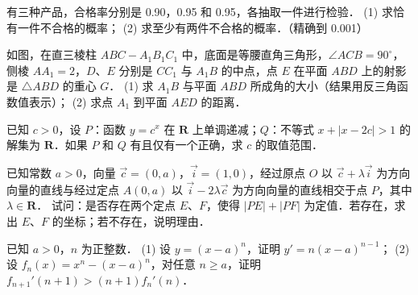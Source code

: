 \begin{question}
有三种产品，合格率分别是 0.90，0.95 和 0.95，各抽取一件进行检验．
(1) 求恰有一件不合格的概率；
(2) 求至少有两件不合格的概率．（精确到 0.001）

\Needspace{0.4\textheight}
\end{question}
\begin{question}
如图，在直三棱柱 $ABC - A_1B_1C_1$ 中，底面是等腰直角三角形，$\angle ACB = 90^\circ$，侧棱 $AA_1 = 2$，$D$、$E$ 分别是 $CC_1$ 与 $A_1B$ 的中点，点 $E$ 在平面 $ABD$ 上的射影是 $\triangle ABD$ 的重心 $G$．
(1) 求 $A_1B$ 与平面 $ABD$ 所成角的大小（结果用反三角函数值表示）；
(2) 求点 $A_1$ 到平面 $AED$ 的距离．
\nopagebreak[4]
\begin{center}\end{center}
\nopagebreak[4]
\end{question}
\begin{question}
已知 $c > 0$，设 $P$：函数 $y = c^x$ 在 $\mathbf{R}$ 上单调递减；$Q$：不等式 $x + |x - 2c| > 1$ 的解集为 $\mathbf{R}$．如果 $P$ 和 $Q$ 有且仅有一个正确，求 $c$ 的取值范围．

\end{question}
\begin{question}
已知常数 $a > 0$，向量 $\vec{c} = (0, a)$，$\vec{i} = (1, 0)$，经过原点 $O$ 以 $\vec{c} + \lambda\vec{i}$ 为方向向量的直线与经过定点 $A(0, a)$ 以 $\vec{i} - 2\lambda\vec{c}$ 为方向向量的直线相交于点 $P$，其中 $\lambda \in \mathbf{R}$．
试问：是否存在两个定点 $E$、$F$，使得 $|PE| + |PF|$ 为定值．若存在，求出 $E$、$F$ 的坐标；若不存在，说明理由．

\end{question}
\begin{question}
已知 $a > 0$，$n$ 为正整数．
(1) 设 $y = (x - a)^n$，证明 $y' = n(x - a)^{n-1}$；
(2) 设 $f_n(x) = x^n - (x - a)^n$，对任意 $n \ge a$，证明 $f_{n+1}'(n+1) > (n+1)f_n'(n)$．

\end{question}